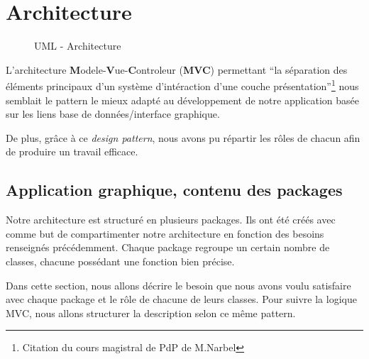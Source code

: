 \chapter{Architecture}
 
\begin{figure}[!h]
\begin{center}
  \caption{UML - Architecture}
  \label{archi} 
\end{center}
\end{figure}

L'architecture \textbf{M}odele-\textbf{V}ue-\textbf{C}ontroleur (\textbf{MVC}) permettant ``la séparation des éléments principaux d'un système d'intéraction d'une couche présentation''\footnote{Citation du cours magistral de PdP de M.Narbel} nous semblait le pattern le mieux adapté au développement de notre application basée sur les liens base de données/interface graphique. 

De plus, grâce à ce \textit{design pattern}, nous avons pu répartir les rôles de chacun afin de produire un travail efficace.

\section{Application graphique, contenu des packages}

Notre architecture est structuré en plusieurs packages. Ils ont été créés avec comme but de compartimenter notre architecture en fonction des besoins renseignés précédemment. Chaque package regroupe un certain nombre de classes, chacune possédant une fonction bien précise.

Dans cette section, nous allons décrire le besoin que nous avons voulu satisfaire avec chaque package et le rôle de chacune de leurs classes. Pour suivre la logique MVC, nous allons structurer la description selon ce même pattern.

